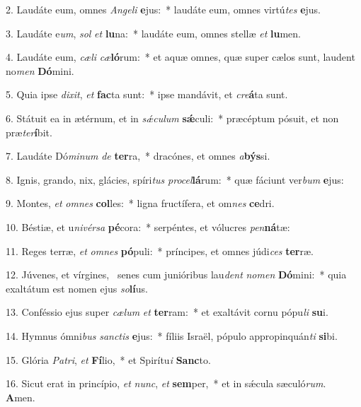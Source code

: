 2. Laudáte eum, omnes \textit{An}\textit{ge}\textit{li} \textbf{e}jus:~*  laudáte eum, omnes virtú\textit{tes} \textbf{e}jus.\

3. Laudáte e\textit{um}, \textit{sol} \textit{et} \textbf{lu}na:~*  laudáte eum, omnes stellæ \textit{et} \textbf{lu}men.\

4. Laudáte eum, \textit{cæ}\textit{li} \textit{cæ}\textbf{ló}rum:~*  et aquæ omnes, quæ super cælos sunt, laudent no\textit{men} \textbf{Dó}mini.\

5. Quia ipse \textit{di}\textit{xit}, \textit{et} \textbf{fac}ta sunt:~*  ipse mandávit, et \textit{cre}\textbf{á}ta sunt.\

6. Státuit ea in ætérnum, et in \textit{sǽ}\textit{cu}\textit{lum} \textbf{sǽ}culi:~*  præcéptum pósuit, et non præ\textit{ter}\textbf{í}bit.\

7. Laudáte Dó\textit{mi}\textit{num} \textit{de} \textbf{ter}ra,~*  dracónes, et omnes \textit{a}\textbf{býs}si.\

8. Ignis, grando, nix, glácies, spíri\textit{tus} \textit{pro}\textit{cel}\textbf{lá}rum:~*  quæ fáciunt ver\textit{bum} \textbf{e}jus:\

9. Montes, \textit{et} \textit{om}\textit{nes} \textbf{col}les:~*  ligna fructífera, et om\textit{nes} \textbf{ce}dri.\

10. Béstiæ, et u\textit{ni}\textit{vér}\textit{sa} \textbf{pé}cora:~*  serpéntes, et vólucres \textit{pen}\textbf{ná}tæ:\

11. Reges terræ, \textit{et} \textit{om}\textit{nes} \textbf{pó}puli:~*  príncipes, et omnes júdi\textit{ces} \textbf{ter}ræ.\

12. Júvenes, et vírgines, \dag\  senes cum junióribus lau\textit{dent} \textit{no}\textit{men} \textbf{Dó}mini:~*  quia exaltátum est nomen ejus \textit{so}\textbf{lí}us.\

13. Conféssio ejus super \textit{cæ}\textit{lum} \textit{et} \textbf{ter}ram:~*  et exaltávit cornu pópu\textit{li} \textbf{su}i.\

14. Hymnus ómni\textit{bus} \textit{sanc}\textit{tis} \textbf{e}jus:~*  fíliis Israël, pópulo appropinquán\textit{ti} \textbf{si}bi.\

15. Glória \textit{Pa}\textit{tri}, \textit{et} \textbf{Fí}lio,~*  et Spirítu\textit{i} \textbf{Sanc}to.\

16. Sicut erat in princípio, \textit{et} \textit{nunc}, \textit{et} \textbf{sem}per,~*  et in sǽcula sæculó\textit{rum}. \textbf{A}men.\

